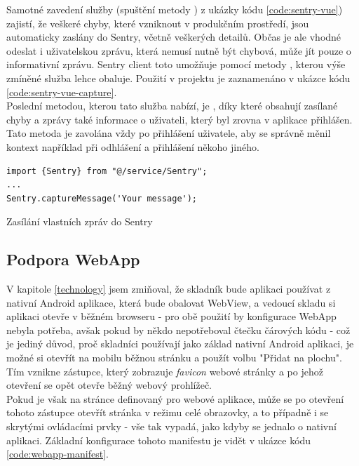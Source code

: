 Samotné zavedení služby (spuštění metody ) z ukázky kódu \ref{code:sentry-vue}) zajistí, že veškeré chyby, které vzniknout v produkčním prostředí, jsou automaticky zaslány do Sentry, včetně veškerých detailů. Občas je ale vhodné odeslat i uživatelskou zprávu, která nemusí nutně být chybová, může jít pouze o informativní zprávu. Sentry client toto umožňuje pomocí metody , kterou výše zmíněné služba lehce obaluje. Použití v projektu je zaznamenáno v ukázce kódu \ref{code:sentry-vue-capture}.\\
Poslední metodou, kterou tato služba nabízí, je , díky které obsahují zasílané chyby a zprávy také informace o uživateli, který byl zrovna v aplikace přihlášen. Tato metoda je zavolána vždy po přihlášení uživatele, aby se správně měnil kontext například při odhlášení a přihlášení někoho jiného.

\begin{listing}[H]
\begin{verbatim}
import {Sentry} from "@/service/Sentry";
...
Sentry.captureMessage('Your message');
\end{verbatim}
\caption{Zasílání vlastních zpráv do Sentry} \label{code:sentry-vue-capture}
\end{listing}


\subsection{Podpora WebApp}

V kapitole \ref{technology} jsem zmiňoval, že skladník bude aplikaci používat z nativní Android aplikace, která bude obalovat WebView, a vedoucí skladu si aplikaci otevře v běžném browseru - pro obě použití by konfigurace WebApp nebyla potřeba, avšak pokud by někdo nepotřeboval čtečku čárových kódu - což je jediný důvod, proč skladníci používají jako základ nativní Android aplikaci, je možné si otevřít na mobilu běžnou stránku a použít volbu "Přidat na plochu". Tím vznikne zástupce, který zobrazuje \emph{favicon} webové stránky a po jehož otevření se opět otevře běžný webový prohlížeč.\\
Pokud je však na stránce definovaný  pro webové aplikace, může se po otevření tohoto zástupce otevřít stránka v režimu celé obrazovky, a to případně i se skrytými ovládacími prvky - vše tak vypadá, jako kdyby se jednalo o nativní aplikaci. Základní konfigurace tohoto manifestu je vidět v ukázce kódu \ref{code:webapp-manifest}.


